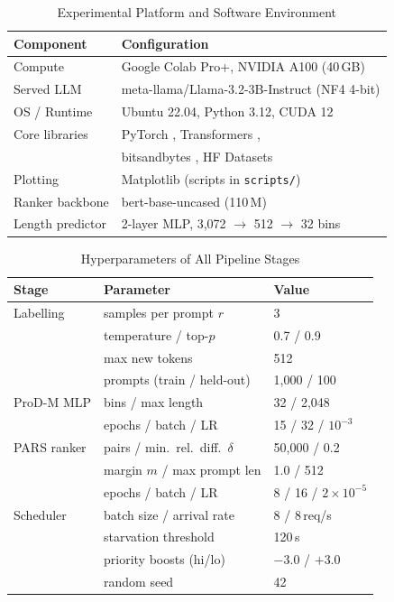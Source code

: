 \documentclass[conference]{IEEEtran}
\begin{document}
\begin{table}[!t]
\caption{Experimental Platform and Software Environment}
\label{tab:platform}
\centering
\begin{tabular}{@{}ll@{}}
\toprule
\textbf{Component} & \textbf{Configuration} \\
\midrule
Compute & Google Colab Pro+, NVIDIA A100 (40\,GB) \\
Served LLM & meta-llama/Llama-3.2-3B-Instruct (NF4 4-bit) \\
OS / Runtime & Ubuntu 22.04, Python 3.12, CUDA 12 \\
Core libraries & PyTorch \cite{paszke2019pytorch}, Transformers \cite{wolf2020transformers},\\
 & bitsandbytes \cite{dettmers2023qlora}, HF Datasets\\
Plotting & Matplotlib \cite{hunter2007matplotlib} (scripts in \texttt{scripts/})\\
Ranker backbone & bert-base-uncased (110\,M) \cite{devlin2019bert}\\
Length predictor & 2-layer MLP, 3{,}072 $\rightarrow$ 512 $\rightarrow$ 32 bins \\
\bottomrule
\end{tabular}
\end{table}
\begin{table}[!t]
\caption{Hyperparameters of All Pipeline Stages}
\label{tab:hyperparams}
\centering
\begin{tabular}{@{}lll@{}}
\toprule
\textbf{Stage} & \textbf{Parameter} & \textbf{Value} \\
\midrule
Labelling & samples per prompt $r$ & 3 \\
 & temperature / top-$p$ & 0.7 / 0.9 \\
 & max new tokens & 512 \\
 & prompts (train / held-out) & 1{,}000 / 100 \\
\addlinespace
ProD-M MLP & bins / max length & 32 / 2{,}048 \\
 & epochs / batch / LR & 15 / 32 / $10^{-3}$ \\
\addlinespace
PARS ranker & pairs / min.\ rel.\ diff.\ $\delta$ & 50{,}000 / 0.2 \\
 & margin $m$ / max prompt len & 1.0 / 512 \\
 & epochs / batch / LR & 8 / 16 / $2\times10^{-5}$ \\
\addlinespace
Scheduler & batch size / arrival rate & 8 / 8\,req/s \\
 & starvation threshold & 120\,s \\
 & priority boosts (hi/lo) & $-3.0$ / $+3.0$ \\
 & random seed & 42 \\
\bottomrule
\end{tabular}
\end{table}
\end{document}
